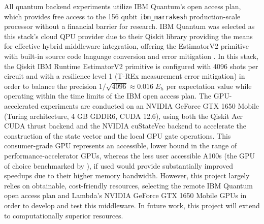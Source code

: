 All quantum backend experiments utilize IBM Quantum’s open access plan, which provides free access to the 156 qubit \texttt{ibm\_marrakesh} production-scale processor without a financial barrier for research. IBM Quantum was selected as this stack's cloud QPU provider due 
to their Qiskit library providing the means for effective hybrid middleware integration, offering the EstimatorV2 primitive with built-in source code language conversion and error mitigation \parencite{rallis2025interfacingquantumcomputingsystems}.  
In this stack, the Qiskit IBM Runtime EstimatorV2 primitive is configured with 4096 shots per circuit and with a resilience level 1 (T-REx measurement error mitigation) in order to balance the precision $1/\sqrt{4096} \approx 0.016\;E_h$ per expectation value while operating within the time limits of the IBM open access plan. 
The GPU-accelerated experiments are conducted on an NVIDIA GeForce GTX 1650 Mobile (Turing architecture, 4 GB GDDR6, CUDA 12.6), 
using both the Qiskit Aer CUDA thrust backend and the NVIDIA cuStateVec backend to accelerate the construction of the state vector and the local GPU gate operations. This consumer-grade GPU represents an accessible, lower bound 
in the range of performance-accelerator GPUs, whereas the less user accessible A100s (the GPU of choice benchmarked by \textcite{bayraktar2023cuquantum}), if used 
would provide substantially improved speedups due to their higher memory bandwidth. However, this project largely relies on obtainable, cost-friendly resources, selecting the remote IBM Quantum open access plan and Lambda's NVIDIA GeForce GTX 1650 Mobile GPUs in order to develop and test this middleware. In future work, this project
will extend to computationally superior resources. 


